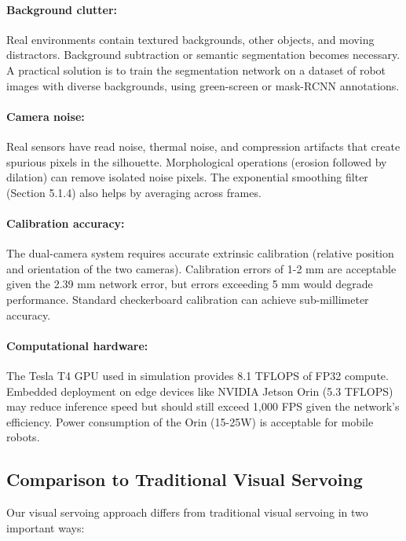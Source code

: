 \documentclass[12pt,a4paper,oneside]{report}
\begin{document}
\paragraph{Background clutter:} Real environments contain textured backgrounds, other objects, and moving distractors. Background subtraction or semantic segmentation becomes necessary. A practical solution is to train the segmentation network on a dataset of robot images with diverse backgrounds, using green-screen or mask-RCNN annotations.

\paragraph{Camera noise:} Real sensors have read noise, thermal noise, and compression artifacts that create spurious pixels in the silhouette. Morphological operations (erosion followed by dilation) can remove isolated noise pixels. The exponential smoothing filter (Section 5.1.4) also helps by averaging across frames.

\paragraph{Calibration accuracy:} The dual-camera system requires accurate extrinsic calibration (relative position and orientation of the two cameras). Calibration errors of 1-2 mm are acceptable given the 2.39 mm network error, but errors exceeding 5 mm would degrade performance. Standard checkerboard calibration can achieve sub-millimeter accuracy.

\paragraph{Computational hardware:} The Tesla T4 GPU used in simulation provides 8.1 TFLOPS of FP32 compute. Embedded deployment on edge devices like NVIDIA Jetson Orin (5.3 TFLOPS) may reduce inference speed but should still exceed 1,000 FPS given the network's efficiency. Power consumption of the Orin (15-25W) is acceptable for mobile robots.

\subsection{Comparison to Traditional Visual Servoing}

Our visual servoing approach differs from traditional visual servoing in two important ways:
\end{document}
